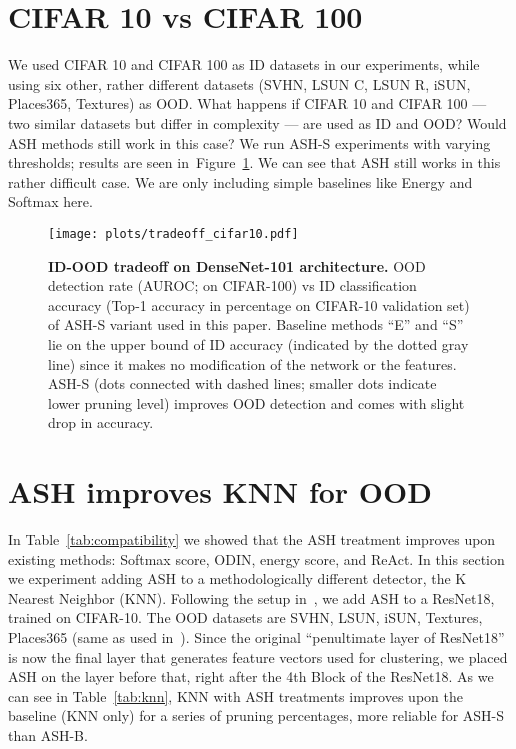\documentclass{article}
\newcommand{\figlabel}[1]{\label{fig:#1}}
\newcommand{\figref}[1]{Figure~\ref{fig:#1}}
\newcommand{\tabref}[1]{Table~\ref{tab:#1}}
\begin{document}
\section{CIFAR 10 vs CIFAR 100}

We used CIFAR 10 and CIFAR 100 as ID datasets in our experiments, while using six other, rather different datasets (SVHN, LSUN C, LSUN R, iSUN, Places365, Textures) as OOD. What happens if CIFAR 10 and CIFAR 100 — two similar datasets but differ in complexity — are used as ID and OOD? Would ASH methods still work in this case? We run ASH-S experiments with varying thresholds; results are seen in~\figref{tradeoff_cifar}. We can see that ASH still works in this rather difficult case. We are only including simple baselines like Energy and Softmax here.

\begin{figure}[hbt!]
    \centering 
	\texttt{[image: plots/tradeoff\_cifar10.pdf]}
	\caption{\textbf{ID-OOD tradeoff on DenseNet-101 architecture.} OOD detection rate (AUROC; on CIFAR-100) vs ID classification accuracy (Top-1 accuracy in percentage on CIFAR-10 validation set) of ASH-S variant used in this paper. Baseline methods ``E'' and ``S'' lie on the upper bound of ID accuracy (indicated by the dotted gray line) since it makes no modification of the network or the features. ASH-S (dots connected with dashed lines; smaller dots indicate lower pruning level) improves OOD detection and comes with slight drop in accuracy.}
	\figlabel{tradeoff_cifar}
\end{figure}



\section{ASH improves KNN for OOD}

In \tabref{compatibility} we showed that the ASH treatment improves upon existing methods: Softmax score, ODIN, energy score, and ReAct. In this section we experiment adding ASH to a methodologically different detector, the K Nearest Neighbor (KNN). Following the setup in~\citep{sun2022out}, we add ASH to a ResNet18, trained on CIFAR-10. The OOD datasets are SVHN, LSUN, iSUN, Textures, Places365 (same as used in~\citep{sun2022out}). Since the original ``penultimate layer of ResNet18'' is now the final layer that generates feature vectors used for clustering, we placed ASH on the layer before that, right after the 4th Block of the ResNet18. As we can see in \tabref{knn}, KNN with ASH treatments improves upon the baseline (KNN only) for a series of pruning percentages, more reliable for ASH-S than ASH-B.
\end{document}
